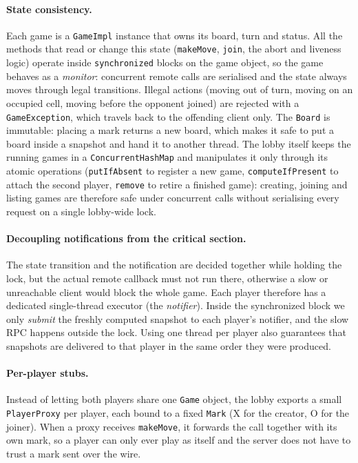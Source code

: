 \documentclass{scrartcl}
\begin{document}
\paragraph{State consistency.} Each game is a \texttt{GameImpl} instance that owns its board, turn and status. All the methods that read or change this state (\texttt{makeMove}, \texttt{join}, the abort and liveness logic) operate inside \texttt{synchronized} blocks on the game object, so the game behaves as a \emph{monitor}: concurrent remote calls are serialised and the state always moves through legal transitions. Illegal actions (moving out of turn, moving on an occupied cell, moving before the opponent joined) are rejected with a \texttt{GameException}, which travels back to the offending client only. The \texttt{Board} is immutable: placing a mark returns a new board, which makes it safe to put a board inside a snapshot and hand it to another thread. The lobby itself keeps the running games in a \texttt{ConcurrentHashMap} and manipulates it only through its atomic operations (\texttt{putIfAbsent} to register a new game, \texttt{computeIfPresent} to attach the second player, \texttt{remove} to retire a finished game): creating, joining and listing games are therefore safe under concurrent calls without serialising every request on a single lobby-wide lock.

\paragraph{Decoupling notifications from the critical section.} The state transition and the notification are decided together while holding the lock, but the actual remote callback must not run there, otherwise a slow or unreachable client would block the whole game. Each player therefore has a dedicated single-thread executor (the \emph{notifier}). Inside the synchronized block we only \emph{submit} the freshly computed snapshot to each player's notifier, and the slow RPC happens outside the lock. Using one thread per player also guarantees that snapshots are delivered to that player in the same order they were produced.

\paragraph{Per-player stubs.} Instead of letting both players share one \texttt{Game} object, the lobby exports a small \texttt{PlayerProxy} per player, each bound to a fixed \texttt{Mark} (X for the creator, O for the joiner). When a proxy receives \texttt{makeMove}, it forwards the call together with its own mark, so a player can only ever play as itself and the server does not have to trust a mark sent over the wire.
\end{document}
